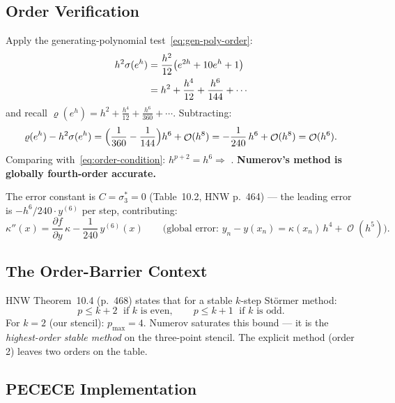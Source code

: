 \documentclass[11pt]{article}
\DeclareMathOperator{\OO}{\mathcal{O}}
\begin{document}
\subsection{Order Verification}

Apply the generating-polynomial test~\eqref{eq:gen-poly-order}:
\begin{align}
  h^2\sigma(e^h)
  &= \frac{h^2}{12}\bigl(e^{2h} + 10e^h + 1\bigr) \notag \\
  &= h^2 + \frac{h^4}{12} + \frac{h^6}{144} + \cdots
     \label{eq:numerov-sigma-expand}
\end{align}
and recall $\varrho(e^h) = h^2 + \tfrac{h^4}{12} + \tfrac{h^6}{360} + \cdots$.
Subtracting:
\begin{equation}
  \label{eq:numerov-residual}
  \varrho(e^h) - h^2\sigma(e^h)
  = \Bigl(\frac{1}{360} - \frac{1}{144}\Bigr)h^6 + \OO(h^8)
  = -\frac{1}{240}\,h^6 + \OO(h^8)
  = \OO(h^6).
\end{equation}
Comparing with~\eqref{eq:order-condition}: $h^{p+2} = h^6 \Rightarrow$
.  \textbf{Numerov's method is globally fourth-order accurate.}

The error constant is $C = \sigma^*_3 = 0$ (Table~10.2, HNW p.~464) --- the
leading error is $-h^6/240 \cdot y^{(6)}$ per step, contributing:
\begin{equation}
  \label{eq:numerov-error}
  \kappa''(x) = \frac{\partial f}{\partial y}\,\kappa - \frac{1}{240}\,y^{(6)}(x)
  \qquad\bigl(\text{global error: } y_n - y(x_n) = \kappa(x_n)\,h^4 + \OO(h^5)\bigr).
\end{equation}

\subsection{The Order-Barrier Context}

HNW Theorem~10.4 (p.~468) states that for a stable $k$-step Störmer method:
\begin{equation}
  p \leq k + 2 \;\text{ if } k \text{ is even},
  \qquad
  p \leq k + 1 \;\text{ if } k \text{ is odd}.
\end{equation}
For $k = 2$ (our stencil): $p_\text{max} = 4$.  Numerov saturates this bound ---
it is the \emph{highest-order stable method} on the three-point stencil.  The
explicit method (order 2) leaves two orders on the table.

\subsection{PECECE Implementation}
\label{ssec:pecece}
\end{document}
